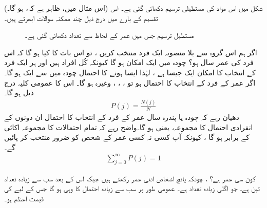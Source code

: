 (اس مثال میں، ظاہر ہے کہ،  ہو گا۔) شکل  میں اس مواد کی مستطیلی ترسیم دکھائی گئی ہے۔ اس تقسیم کے بارے میں درج ذیل چند ممکنہ سوالات ابھرتے ہیں۔ 

\begin{figure}
\centering
{}
\caption
{مستطیل ترسیم جس میں عمر  کے لحاظ سے تعداد  دکھائی گئی ہے۔}
\label{شکل_تفاعل_موج_عمر_مستطیل_ترسیم}
\end{figure}

\quad 
اگر ہم اس گروہ سے بلا منصوبہ ایک فرد منتخب کریں ، تو اس بات کا کیا  ہو گا کہ اس فرد کی عمر  سال ہو؟ 
\quad 
چودہ میں ایک امکان ہو گا کیونکہ کُل  افراد ہیں اور ہر ایک فرد کے انتخاب کا امکان ایک جیسا ہے ، لہٰذا ایسا ہونے کا احتمال چودہ میں سے ایک    ہو گا۔ اگر  عمر کے فرد کے انتخاب کا احتمال ہو تو ، ، ، وغیرہ ہو گا۔ اس کا عمومی کلیہ درج ذیل ہو گا۔
\begin{align}
P(j) = \frac{N(j)}{N} 
\end{align}
دھیان رہے کہ چودہ یا پندرہ سال عمر کے فرد کے انتخاب کا احتمال ان دونوں کے انفرادی احتمال کا مجموعہ،  یعنی  ہو گا۔واضح رہے کہ تمام احتمالات کا مجموعہ اکائی  کے برابر ہو گا ، کیونکہ آپ کسی نہ کسی عمر کے شخص کو ضرور منتخب کر پائیں گے۔ 
\begin{align}\label{مساوات_تفاعل_موج_کل_احتمال_اکائی}
\sum_{j=0}^{\infty} P(j) = 1
\end{align}

 \quad 
کون سی عمر  ہے؟
 \quad  
{}، چونکہ پانچ اشخاص اتنی عمر رکھتے ہیں جبکہ  اس کے بعد سب سے زیادہ تعداد تین ہے، جو اگلی زیادہ تعداد ہے۔  عمومی طور پر سب سے زیادہ احتمال کا  وہی  ہو گا جس کے لیے کی قیمت اعظم ہو۔ 

